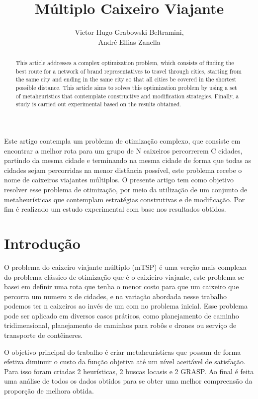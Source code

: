 \documentclass[12pt]{article}
\title{Múltiplo Caixeiro Viajante}
\author{Victor Hugo Grabowski Beltramini\inst{1},\\ André Ellias Zanella\inst{2}}
\begin{document}
\maketitle

\begin{abstract}
  This article addresses a complex optimization problem, which consists of finding the best route for a network of brand representatives to travel through cities, starting from the same city and ending in the same city so that all cities be covered in the shortest possible distance. This article aims to solves this optimization problem by using a set of metaheuristics that contemplate constructive and modification strategies. Finally, a study is carried out experimental based on the results obtained.
\end{abstract}

\begin{resumo}
  Este artigo contempla um problema de otimização complexo, que consiste em encontrar a melhor rota para um grupo de N caixeiros percorrerem C cidades, partindo da mesma cidade e terminando na mesma cidade de forma que todas as cidades sejam percorridas na menor distância possível, este problema recebe o nome de caixeiros viajantes múltiplos. O presente artigo tem como objetivo resolver esse problema de otimização, por meio da utilização de um conjunto de metaheurísticas que contemplam estratégias construtivas e de modificação. Por fim é realizado um estudo experimental com base nos resultados obtidos.
\end{resumo}

\section{Introdução}

O problema do caixeiro viajante múltiplo (mTSP) é uma verção mais complexa do problema clássico de otimização que é o caixieiro viajante, este problema se basei em definir uma rota que tenha o menor costo para que um caixeiro que percorra um numero x de cidades, e na variação abordada nesse trabalho podemos ter n caixeiros ao invés de um com no problema inicial. Esse problema pode ser aplicado em diversos casos práticos, como planejamento de caminho tridimensional, planejamento de caminhos para robôs e drones ou serviço de transporte de contêineres.

O objetivo principal do trabalho é criar metaheurísticas que possam de forma efetiva diminuir o custo da função objetiva até um nível aceitável de satisfação. Para isso foram criadas 2 heurísticas, 2 buscas locasis e 2 GRASP. Ao final é feita uma análise de todos os dados obtidos para se obter uma melhor compreensão da proporção de melhora obtida.
\end{document}
